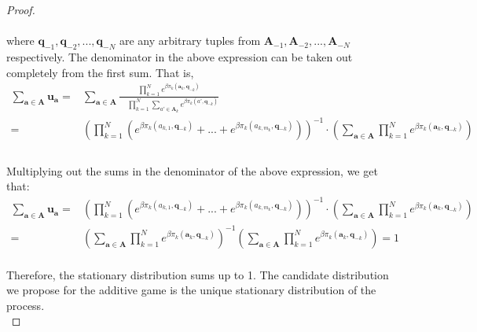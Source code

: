 \documentclass[11pt]{article}
\theoremstyle{plainCl1}
\theoremstyle{plainCl2}
\newcommand{\A}{\mathbf{A}}
\newcommand{\abf}{\mathbf{a}}
\newcommand{\qbf}{\mathbf{q}}
\newcommand{\ubf}{\mathbf{u}}
\begin{document}
\begin{proof}
\noindent \\ \\ where $\qbf_{-1}, \qbf_{-2},...,\qbf_{-N}$ are any arbitrary tuples from $\A_{-1}, \A_{-2},...,\A_{-N}$ respectively. The denominator in the above expression can be taken out completely from the first sum. That is, \\
\begin{align}
\sum_{\abf \in \A} \ubf_\abf = &\sum_{\abf \in \A} \frac{\displaystyle \prod_{k=1}^N e^{\beta \pi_k(\abf_k, \qbf_{-k})}}{\displaystyle \quad \prod_{k=1}^N \sum_{a' \in \A_k} e^{\beta \pi_k(a',\qbf_{-k})}} \\[15pt]
=& \left( \displaystyle \prod_{k=1}^N \left( e^{\beta \pi_k(a_{k,1}, \qbf_{-k})}+... + e^{\beta \pi_k(a_{k,m_k}, \qbf_{-k})} \right) \right)^{-1} \cdot \left( \sum_{\abf \in \A} \displaystyle \prod_{k=1}^N e^{\beta \pi_k(\abf_k, \qbf_{-k})} \right) \\
\end{align} \\
\noindent Multiplying out the sums in the denominator of the above expression, we get that:
\begin{align}
\sum_{\abf \in \A} \ubf_\abf =& \left( \displaystyle \prod_{k=1}^N \left( e^{\beta \pi_k(a_{k,1}, \qbf_{-k})}+... + e^{\beta \pi_k(a_{k,m_k}, \qbf_{-k})} \right) \right)^{-1} \cdot \left( \sum_{\abf \in \A} \displaystyle \prod_{k=1}^N e^{\beta \pi_k(\abf_k, \qbf_{-k})} \right) \\[10pt]
=& \left( \sum_{\abf \in \A} \displaystyle \prod_{k=1}^N e^{\beta \pi_k(\abf_k, \qbf_{-k})}  \right)^{-1} \left( \sum_{\abf \in \A} \displaystyle \prod_{k=1}^N e^{\beta \pi_k(\abf_k, \qbf_{-k})}  \right) = 1
\end{align} \\ 
\noindent Therefore, the stationary distribution sums up to 1. The candidate distribution we propose for the additive game is the unique stationary distribution of the process.\\
\end{proof}
\end{document}
